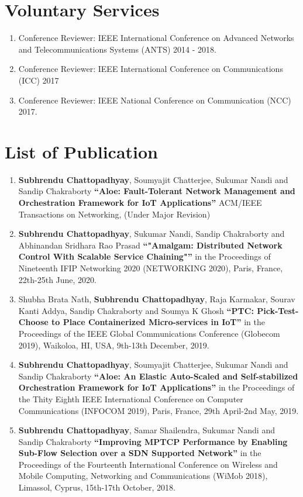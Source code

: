 \documentclass{res}
\newcommand{\papertitle}[1]{\textbf{ ``#1''}}
\newcommand{\authorMe}{{\bf Subhrendu Chattopadhyay}}
\begin{document}
\begin{resume}
\section{Voluntary Services}
  \begin{enumerate}
   \item Conference Reviewer: IEEE International Conference on Advanced Networks and Telecommunications Systems (ANTS) 2014 - 2018.
   \item Conference Reviewer: IEEE  International Conference on Communications (ICC) 2017
   \item Conference Reviewer: IEEE National Conference on Communication (NCC) 2017.
  \end{enumerate}
\section{List of Publication} 
	\begin{enumerate}
        \item \authorMe, Soumyajit Chatterjee, Sukumar Nandi and Sandip Chakraborty \papertitle{Aloe: Fault-Tolerant Network Management and Orchestration Framework for IoT Applications} ACM/IEEE Transactions on Networking, (Under Major Revision)
        \item \authorMe,  Sukumar Nandi, Sandip Chakraborty and Abhinandan Sridhara Rao Prasad \papertitle{"Amalgam: Distributed Network Control With Scalable Service Chaining"} in the Proceedings of Nineteenth IFIP Networking 2020 (NETWORKING 2020), Paris, France, 22th-25th June, 2020.
        \item Shubha Brata Nath, \authorMe, Raja Karmakar, Sourav Kanti Addya, Sandip Chakraborty and Soumya K Ghosh \papertitle{PTC: Pick-Test-Choose to Place Containerized Micro-services in IoT} in the Proceedings of the IEEE Global Communications Conference (Globecom 2019), Waikoloa, HI, USA, 9th-13th December, 2019.
        \item  \authorMe, Soumyajit Chatterjee, Sukumar Nandi and Sandip Chakraborty \papertitle{Aloe: An Elastic Auto-Scaled and Self-stabilized Orchestration Framework for IoT Applications} in the Proceedings of the Thity Eighth IEEE International Conference on Computer Communications (INFOCOM 2019), Paris, France, 29th April-2nd May, 2019.
        \item \authorMe, Samar Shailendra, Sukumar Nandi and Sandip Chakraborty \papertitle{Improving MPTCP Performance by Enabling Sub-Flow Selection over a SDN Supported Network} in the Proceedings of the Fourteenth International Conference on Wireless and Mobile Computing, Networking and Communications (WiMob 2018), Limassol, Cyprus, 15th-17th October, 2018.

\end{enumerate}
\end{resume}
\end{document}
